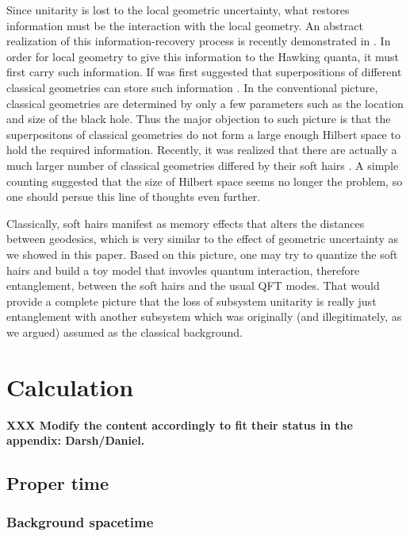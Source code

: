 \documentclass[aps,showpacs,twocolumn,floats,prd,superscriptaddress,nofootinbib]{revtex4-1}
\begin{document}
Since unitarity is lost to the local geometric uncertainty, what restores information must be the interaction with the local geometry. 
An abstract realization of this information-recovery process is recently demonstrated in \cite{OsuPag16}. 
In order for local geometry to give this information to the Hawking quanta, it must first carry such information.
If was first suggested that superpositions of different classical geometries can store such information \cite{NomVar12}.
In the conventional picture, classical geometries are determined by only a few parameters such as the location and size of the black hole.
Thus the major objection to such picture is that the superpositons of classical geometries do not form a large enough Hilbert space to hold the required information.
Recently, it was realized that there are actually a much larger number of classical geometries differed by their soft hairs \cite{HawPer16}.
A simple counting suggested that the size of Hilbert space seems no longer the problem, so one should persue this line of thoughts even further.

Classically, soft hairs manifest as memory effects that alters the distances between geodesics, which is very similar to the effect of geometric uncertainty as we showed in this paper.
Based on this picture, one may try to quantize the soft hairs and build a toy model that invovles quantum interaction, therefore entanglement, between the soft hairs and the usual QFT modes.
That would provide a complete picture that the loss of subsystem unitarity is really just entanglement with another subsystem which was originally (and illegitimately, as we argued) assumed as the classical background.


\appendix


\section{Calculation}

{\bf XXX Modify the content accordingly to fit their status in the appendix: Darsh/Daniel.}

\subsection{Proper time}

\subsubsection{Background spacetime}
\end{document}
